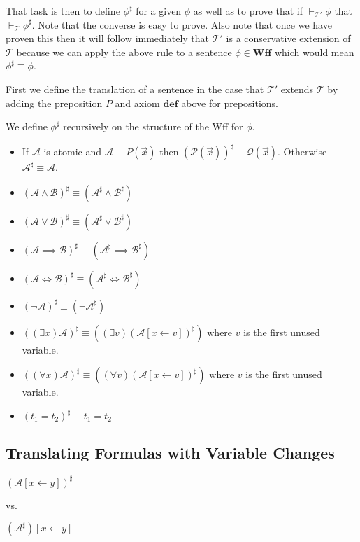 \documentclass[12pt]{article}
\newcommand{\bv}[1]{\boldsymbol{#1}}
\newcommand{\mc}[1]{\mathcal{#1}}
\newcommand{\bc}[1]{\bv{\mc{#1}}}
\begin{document}
That task is then to define $\phi^{\sharp}$ for a given $\phi$ as well as to prove that if $\vdash_{\bc{T}'}\phi$ that $\vdash_{\bc{T}}\phi^{\sharp}$. Note that the converse is easy to prove. Also note that once we have proven this then it will follow immediately that $\bc{T}'$ is a conservative extension of $\bc{T}$ because we can apply the above rule to a sentence $\phi \in \textbf{Wff}$ which would mean $\phi^{\sharp} \equiv \phi$.

First we define the translation of a sentence in the case that $\bc{T}'$ extends $\bc{T}$ by adding the preposition $P$ and axiom $\textbf{def}$ above for prepositions.

We define $\phi^{\sharp}$ recursively on the structure of the Wff for $\phi$. 

\begin{itemize}
\item{If $\mc{A}$ is atomic and $\mc{A} \equiv P(\vec{x})$ then $(\mc{P}(\vec{x}))^{\sharp} \equiv \mc{Q}(\vec{x})$. Otherwise $\mc{A}^{\sharp} \equiv \mc{A}$.}
\item{$(\mc{A}\land \mc{B})^{\sharp} \equiv (\mc{A}^{\sharp} \land \mc{B}^{\sharp})$}
\item{$(\mc{A} \lor \mc{B})^{\sharp} \equiv (\mc{A}^{\sharp} \lor \mc{B}^{\sharp})$}
\item{$(\mc{A} \implies \mc{B})^{\sharp} \equiv (\mc{A}^{\sharp} \implies \mc{B}^{\sharp})$}
\item{$(\mc{A}\iff \mc{B})^{\sharp} \equiv (\mc{A}^{\sharp} \iff \mc{B}^{\sharp})$}
\item{$(\lnot \mc{A})^{\sharp} \equiv (\lnot \mc{A}^{\sharp})$}
\item{$((\exists x)\mc{A})^{\sharp} \equiv ((\exists v)(\mc{A}[x\leftarrow v])^{\sharp})$ where $v$ is the first unused variable.}
\item{$((\forall x)\mc{A})^{\sharp} \equiv ((\forall v)(\mc{A}[x\leftarrow v])^{\sharp})$ where $v$ is the first unused variable.}
\item{$(t_1=t_2)^{\sharp} \equiv t_1=t_2$}
\end{itemize}

\subsection*{Translating Formulas with Variable Changes}

$(\mc{A}[x\leftarrow y])^{\sharp}$

vs.

$(\mc{A}^{\sharp})[x\leftarrow y]$
\end{document}
